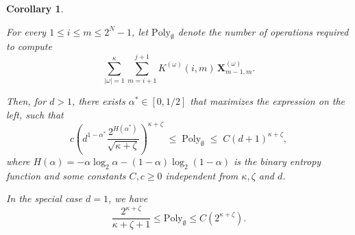 \documentclass{article}%
\newtheorem{corollary}[theorem]{Corollary}
\begin{document}
\begin{corollary}\label{corollary_trace_lvl}

For every $1 \le i \le m \le 2^N - 1$, let $\mathrm{Poly}_{\emptyset}$ denote the number of operations required to compute
\[
\sum_{|\omega| = 1}^{\kappa} \sum_{m=i+1}^{j+1} K^{(\omega)}(i,m) \, \mathbf{X}^{(\omega)}_{m-1, m}.
\]

Then, for $d > 1$, there exists $\alpha^* \in [0,1/2]$ that maximizes the expression on the left, such that
\[
c\left(d^{1 - \alpha^*} \frac{2^{H(\alpha^*)}}{\sqrt{\kappa + \zeta}}\right)^{\kappa + \zeta}
\;\leq\; \mathrm{Poly}_{\emptyset} \;\leq\; C(d+1)^{\kappa+\zeta},
\]
where $H(\alpha) = -\alpha \log_2 \alpha - (1-\alpha) \log_2 (1-\alpha)$ is the binary entropy function and some constants $C,c \geq 0$ independent from $\kappa, \zeta$ and $d$.

In the special case $d=1$, we have
\[
\frac{2^{\kappa + \zeta}}{\kappa + \zeta + 1}  \leq \mathrm{Poly}_{\emptyset} \leq C\left(2^{\kappa + \zeta}\right).
\]

  
\end{corollary}
\end{document}
